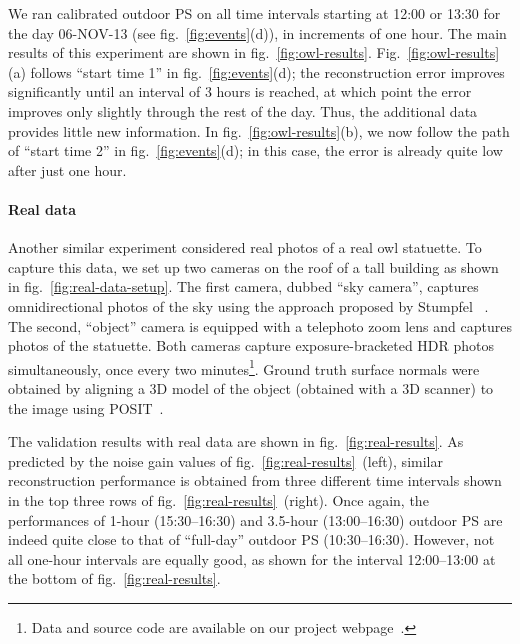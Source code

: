 
We ran calibrated outdoor PS on all time intervals starting at 12:00 or 13:30 for the day 06-NOV-13 (see fig.~\ref{fig:events}(d)), in increments of one hour. The main results of this experiment are shown in fig.~\ref{fig:owl-results}. Fig.~\ref{fig:owl-results}(a) follows ``start time 1'' in fig.~\ref{fig:events}(d); the reconstruction error improves significantly until an interval of 3 hours is reached, at which point the error improves only slightly through the rest of the day. Thus, the additional data provides little new information. In fig.~\ref{fig:owl-results}(b), we now follow the path of ``start time 2'' in fig.~\ref{fig:events}(d); in this case, the error is already quite low after just one hour.
%

\paragraph{Real data}%
%
Another similar experiment considered real photos of a real owl statuette. To capture this data, we set up two cameras on the roof of a tall building as shown in fig.~\ref{fig:real-data-setup}. The first camera, dubbed ``sky camera'', captures omnidirectional photos of the sky using the approach proposed by Stumpfel \etal~\cite{stumpfel-afrigraph-04}. The second, ``object'' camera is equipped with a telephoto zoom lens and captures photos of the statuette. Both cameras capture exposure-bracketed HDR photos simultaneously, once every two minutes\footnote{Data and source code are available on our project webpage~\cite{webpageXhourPS}.}. Ground truth surface normals were obtained by aligning a 3D model of the object (obtained with a 3D scanner) to the image using POSIT~\cite{dementhon-ijcv-95}. 

The validation results with real data are shown in fig.~\ref{fig:real-results}. As predicted by the noise gain values of fig.~\ref{fig:real-results}~(left), similar reconstruction performance is obtained from three different time intervals shown in the top three rows of fig.~\ref{fig:real-results}~(right). Once again, the performances of 1-hour (15:30--16:30) and 3.5-hour (13:00--16:30) outdoor PS are indeed quite close to that of ``full-day'' outdoor PS (10:30--16:30). However, not all one-hour intervals are equally good, as shown for the interval 12:00--13:00 at the bottom of fig.~\ref{fig:real-results}.


